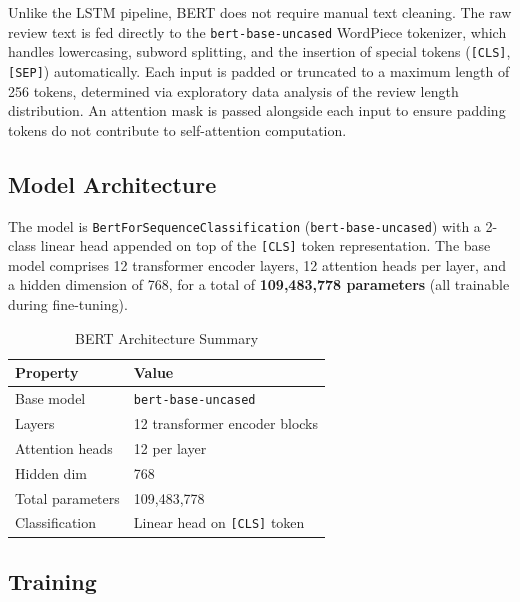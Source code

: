 \documentclass[11pt, a4paper]{article}
\begin{document}
Unlike the LSTM pipeline, BERT does not require manual text cleaning. The raw review text is fed directly to the \texttt{bert-base-uncased} WordPiece tokenizer, which handles lowercasing, subword splitting, and the insertion of special tokens (\texttt{[CLS]}, \texttt{[SEP]}) automatically. Each input is padded or truncated to a maximum length of 256 tokens, determined via exploratory data analysis of the review length distribution. An attention mask is passed alongside each input to ensure padding tokens do not contribute to self-attention computation.

\subsection{Model Architecture}

The model is \texttt{BertForSequenceClassification} (\texttt{bert-base-uncased}) with a 2-class linear head appended on top of the \texttt{[CLS]} token representation. The base model comprises 12 transformer encoder layers, 12 attention heads per layer, and a hidden dimension of 768, for a total of \textbf{109,483,778 parameters} (all trainable during fine-tuning).

\begin{table}[h]
\centering
\caption{BERT Architecture Summary}
\begin{tabular}{ll}
\toprule
\textbf{Property} & \textbf{Value} \\
\midrule
Base model       & \texttt{bert-base-uncased} \cite{devlin2019bert} \\
Layers           & 12 transformer encoder blocks \\
Attention heads  & 12 per layer \\
Hidden dim       & 768 \\
Total parameters & 109,483,778 \\
Classification   & Linear head on \texttt{[CLS]} token \\
\bottomrule
\end{tabular}
\end{table}

\subsection{Training}
\end{document}
